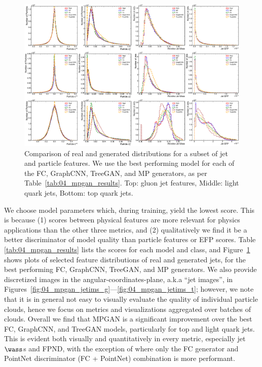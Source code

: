 \begin{figure}[htpb]
    \centering
    \centerline{\includegraphics[width=\textwidth]{figures/04-ML4Sim/mpgan/results/feature_distributions.pdf}}
    \caption[Comparison of real and generated distributions for a subset of jet and particle features.]{Comparison of real and generated distributions for a subset of jet and particle features. We use the best performing model for each of the FC, GraphCNN, TreeGAN, and MP generators, as per Table~\ref{tab:04_mpgan_results}. Top: gluon jet features, Middle: light quark jets, Bottom: top quark jets.
    }
    \label{fig:04_mpgan_results}
\end{figure}

We choose model parameters which, during training, yield the lowest \wassm score.
This is because (1) \wass scores between physical features are more relevant for physics applications than the other three metrics, and (2) qualitatively we find it be a better discriminator of model quality than particle features or EFP scores.
Table \ref{tab:04_mpgan_results} lists the scores for each model and class, and Figure~\ref{fig:04_mpgan_results} shows plots of selected feature distributions of real and generated jets, for the best performing FC, GraphCNN, TreeGAN, and MP generators.
We also provide discretized images in the angular-coordinates-plane, a.k.a ``jet images'', in Figures~\ref{fig:04_mpgan_jetims_g}---\ref{fig:04_mpgan_jetims_t}; however, we note that it is in general not easy to visually evaluate the quality of individual particle clouds, hence we focus on metrics and visualizations aggregated over batches of clouds.
Overall we find that MPGAN is a significant improvement over the best FC, GraphCNN, and TreeGAN models, particularly for top and light quark jets.
This is evident both visually and quantitatively in every metric, especially jet $\wass$s and FPND, with the exception of \wassp where only the FC generator and PointNet discriminator (FC + PointNet) combination is more performant.

